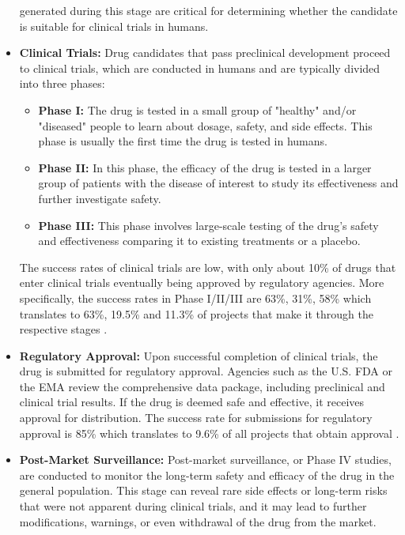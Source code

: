 \begin{itemize}
	      generated during this stage are critical for determining whether the candidate is
	      suitable for clinical trials in humans.
	\item \textbf{Clinical Trials:} Drug candidates that pass preclinical development proceed to
	      clinical trials, which are conducted in humans and are typically divided into three phases:
	      \begin{itemize}
		      \item \textbf{Phase I:} The drug is tested in a small group of "healthy" and/or "diseased" people to learn about
		            dosage, safety, and side effects. This phase is usually the first time the drug is tested in humans.
		      \item \textbf{Phase II:} In this phase, the efficacy of the drug is tested in a larger
		            group of patients with the disease of interest to study its effectiveness and further investigate safety.
		      \item \textbf{Phase III:} This phase involves large-scale testing of the drug's safety
		            and effectiveness comparing it to existing treatments or a placebo.
	      \end{itemize}
	      The success rates of clinical trials are low, with only about 10\% of drugs that enter clinical
	      trials eventually being approved by regulatory agencies. More specifically, the success rates in
	      Phase I/II/III are 63\%, 31\%, 58\% which translates to 63\%, 19.5\% and 11.3\% of projects that
	      make it through the respective stages \citep{mullardParsingClinicalSuccess2016}.
	\item \textbf{Regulatory Approval:} Upon successful completion of clinical trials, the drug is
	      submitted for regulatory approval. Agencies such as the U.S. \Ac{FDA} or the \Ac{EMA}
	      review the comprehensive data package, including preclinical and clinical trial results.
	      If the drug is deemed safe and effective, it receives approval for distribution. The
	      success rate for submissions for regulatory approval is 85\% which translates to 9.6\% of
	      all projects that obtain approval \citep{mullardParsingClinicalSuccess2016}.
	\item \textbf{Post-Market Surveillance:} Post-market surveillance, or Phase IV studies, are
	      conducted to monitor the long-term safety and efficacy of the drug in the general population.
	      This stage can reveal rare side effects or long-term risks that were not apparent during
	      clinical trials, and it may lead to further modifications, warnings, or even withdrawal of the
	      drug from the market.
\end{itemize}

